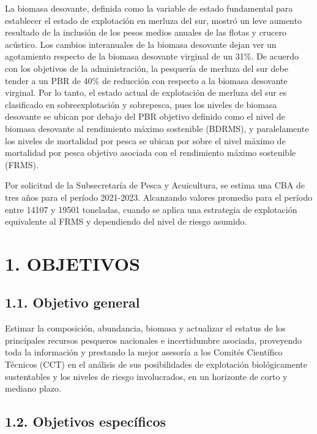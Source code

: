 \documentclass[
  spanish,
]{article}
\begin{document}
La biomasa desovante, definida como la variable de estado fundamental
para establecer el estado de explotación en merluza del sur, mostró un
leve aumento resultado de la inclusión de los pesos medios anuales de
las flotas y crucero acústico. Los cambios interanuales de la biomasa
desovante dejan ver un agotamiento respecto de la biomasa desovante
virginal de un 31\%. De acuerdo con los objetivos de la administración,
la pesquería de merluza del sur debe tender a un PBR de 40\% de
reducción con respecto a la biomasa desovante virginal. Por lo tanto, el
estado actual de explotación de merluza del sur es clasificado en
sobreexplotación y sobrepesca, pues los niveles de biomasa desovante se
ubican por debajo del PBR objetivo definido como el nivel de biomasa
desovante al rendimiento máximo sostenible (BDRMS), y paralelamente los
niveles de mortalidad por pesca se ubican por sobre el nivel máximo de
mortalidad por pesca objetivo asociada con el rendimiento máximo
sostenible (FRMS).

Por solicitud de la Subsecretaría de Pesca y Acuicultura, se estima una
CBA de tres años para el período 2021-2023. Alcanzando valores promedio
para el período entre 14107 y 19501 toneladas, cuando se aplica una
estrategia de explotación equivalente al FRMS y dependiendo del nivel de
riesgo asumido.

\pagebreak

\hypertarget{objetivos}{%
\section{1. OBJETIVOS}\label{objetivos}}

\hypertarget{objetivo-general}{%
\subsection{1.1. Objetivo general}\label{objetivo-general}}

Estimar la composición, abundancia, biomasa y actualizar el estatus de
los principales recursos pesqueros nacionales e incertidumbre asociada,
proveyendo toda la información y prestando la mejor asesoría a los
Comités Científico Técnicos (CCT) en el análisis de sus posibilidades de
explotación biológicamente sustentables y los niveles de riesgo
involucrados, en un horizonte de corto y mediano plazo.

\hypertarget{objetivos-especuxedficos}{%
\subsection{1.2. Objetivos específicos}\label{objetivos-especuxedficos}}
\end{document}
